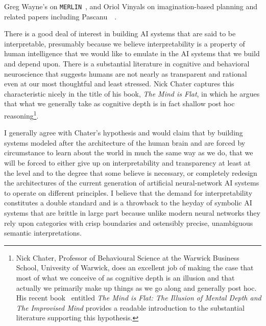 
Greg Wayne's {} on {\tt{MERLIN}}~\cite{WayneetalCoRR-18}, and Oriol Vinyals {} on imagination-based planning and related papers including Pascanu~\etal{}~\cite{PascanuetalCoRR-17}.


There is a good deal of interest in building AI systems that are said to be interpretable, presumably because we believe interpretability is a property of human intelligence that we would like to emulate in the AI systems that we build and depend upon. There is a substantial literature in cognitive and behavioral neuroscience that suggests humans are not nearly as transparent and rational even at our most thoughtful and least stressed. Nick Chater captures this characteristic nicely in the title of his book, {\it{The Mind is Flat}}, in which he argues that what we generally take as cognitive depth is in fact shallow post hoc reasoning\footnote{%
%
  Nick Chater, Professor of Behavioural Science at the Warwick Business School, Univesity of Warwick, does an excellent job of making the case that most of what we conceive of as cognitive depth is an illusion and that actually we primarily make up things as we go along and generally post hoc. His recent book~\cite{Chater2018} entitled {\it{The Mind is Flat: The Illusion of Mental Depth and The Improvised Mind}} provides a readable introduction to the substantial literature supporting this hypothesis.}.

I generally agree with Chater's hypothesis and would claim that by building systems modeled after the architecture of the human brain and are forced by circumstance to learn about the world in much the same way as we do, that we will be forced to either give up on interpretability and transparency at least at the level and to the degree that some believe is necessary, or completely redesign the architectures of the current generation of artificial neural-network AI systems to operate on different principles. I believe that the demand for interpretability constitutes a double standard and is a throwback to the heyday of symbolic AI systems that are brittle in large part because unlike modern neural networks they rely upon categories with crisp boundaries and ostensibly precise, unambiguous semantic interpretations.

